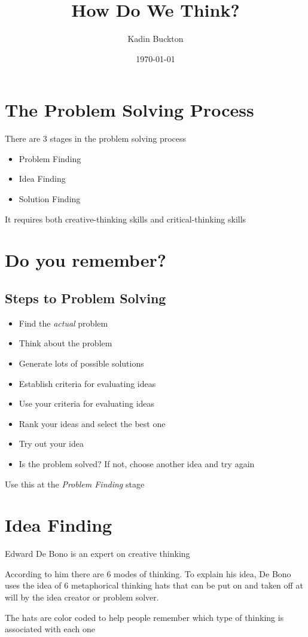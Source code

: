 \documentclass[11pt]{article}
\author{Kadin Buckton}
\date{\today}
\title{How Do We Think?}
\begin{document}
\maketitle

\section*{The Problem Solving Process}
\label{sec:org23660a7}
There are 3 stages in the problem solving process

\begin{itemize}
\item Problem Finding
\item Idea Finding
\item Solution Finding
\end{itemize}
It requires both creative-thinking skills and critical-thinking skills

\section*{Do you remember?}
\label{sec:org128c45e}

\subsection*{Steps to Problem Solving}
\label{sec:orgfec5a81}
\begin{itemize}
\item Find the \emph{actual} problem
\item Think about the problem
\item Generate lots of possible solutions
\item Establish criteria for evaluating ideas
\item Use your criteria for evaluating ideas
\item Rank your ideas and select the best one
\item Try out your idea
\item Is the problem solved? If not, choose another idea and try again
\end{itemize}
Use this at the \emph{Problem Finding} stage


\section*{Idea Finding}
\label{sec:orgc36e320}
Edward De Bono is an expert on creative thinking

According to him there are 6 modes of thinking. To explain his idea, De Bono uses the idea of 6 metaphorical thinking hats that can be put on and taken off at will by the idea creator or problem solver.

The hats are color coded to help people remember which type of thinking is associated with each one
\end{document}
